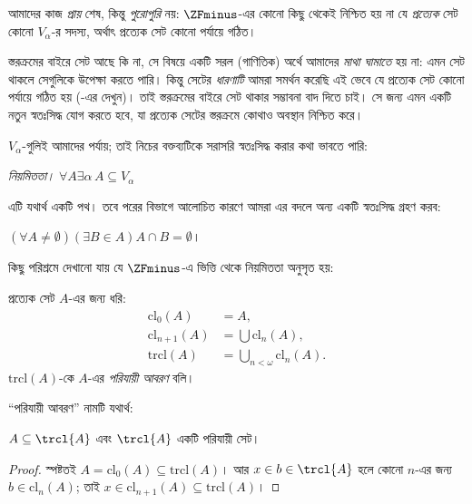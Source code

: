 \documentclass[../../../include/open-logic-section]{subfiles}
\begin{document}


আমাদের কাজ \emph{প্রায়} শেষ, কিন্তু \emph{পুরোপুরি}
নয়: $\ZFminus$-এর কোনো কিছু থেকেই নিশ্চিত হয়
না যে \emph{প্রত্যেক} সেট কোনো $V_\alpha$-র
সদস্য, অর্থাৎ প্রত্যেক সেট কোনো পর্যায়ে গঠিত।

স্তরক্রমের বাইরে সেট আছে কি না, সে বিষয়ে
একটি সরল (গাণিতিক) অর্থে আমাদের \emph{মাথা
ঘামাতে} হয় না: এমন সেট থাকলে সেগুলিকে উপেক্ষা
করতে পারি। কিন্তু সেটের \emph{ধারণাটি} আমরা
সমর্থন করেছি এই ভেবে যে প্রত্যেক সেট কোনো
পর্যায়ে গঠিত হয় (-এর
\stageshier{} দেখুন)। তাই স্তরক্রমের বাইরে সেট
থাকার সম্ভাবনা বাদ দিতে চাই। সে জন্য এমন একটি
নতুন স্বতঃসিদ্ধ যোগ করতে হবে, যা প্রত্যেক সেটের
স্তরক্রমে কোথাও অবস্থান নিশ্চিত করে।

$V_\alpha$-গুলিই আমাদের পর্যায়; তাই নিচের
বক্তব্যটিকে সরাসরি স্বতঃসিদ্ধ করার কথা ভাবতে
পারি:

\begin{defish}
\emph{নিয়মিততা।} $\forall A \exists \alpha\, A \subseteq V_\alpha$
\end{defish}

এটি যথার্থ একটি পথ। তবে পরের বিভাগে আলোচিত
কারণে আমরা এর বদলে অন্য একটি স্বতঃসিদ্ধ গ্রহণ
করব:

\begin{axiom}[ভিত্তি]
$(\forall A \neq \emptyset)(\exists B \in A)A \cap B = \emptyset$।
\end{axiom}

কিছু পরিশ্রমে দেখানো যায় যে $\ZFminus$-এ
ভিত্তি থেকে নিয়মিততা অনুসৃত হয়:
\begin{defn}
প্রত্যেক সেট $A$-এর জন্য ধরি:
\begin{align*}
	\text{cl}_0(A) &= A,\\
	\text{cl}_{n+1}(A) &= \bigcup \text{cl}_n(A),\\
	\text{trcl}(A) &= \bigcup_{n < \omega} \text{cl}_{n}(A).
\end{align*}
$\text{trcl}(A)$-কে $A$-এর \emph{পরিযায়ী আবরণ}
বলি।
\end{defn}
\noindent
``পরিযায়ী আবরণ'' নামটি যথার্থ:
\begin{prop}
$A \subseteq \trcl{A}$ এবং $\trcl{A}$ একটি
পরিযায়ী সেট।
\end{prop}

\begin{proof}
স্পষ্টতই $A = \text{cl}_0(A) \subseteq \text{trcl}(A)$।
আর $x
\in b \in \trcl{A}$ হলে কোনো $n$-এর জন্য
$b \in \text{cl}_n(A)$; তাই $x
\in \text{cl}_{n+1}(A) \subseteq \text{trcl}(A)$।
\end{proof}
\end{document}
